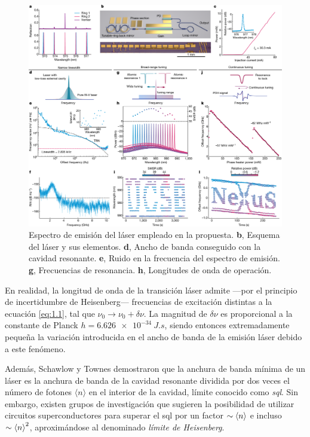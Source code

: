 \begin{figure}[ht!]
  \centering
  \includegraphics[width=\textwidth]{Figuras/ch1_amplif.png}
  \caption{Espectro de emisión del láser empleado en la propuesta\autocite{Tran2022}. \textbf{b}, Esquema del láser y sus elementos. \textbf{d}, Ancho de banda conseguido con la cavidad resonante. \textbf{e}, Ruido en la frecuencia del espectro de emisión. \textbf{g}, Frecuencias de resonancia. \textbf{h}, Longitudes de onda de operación.}
  \label{fig:ch1_amplif}
\end{figure}

En realidad, la longitud de onda de la transición láser admite ---por el principio de incertidumbre de Heisenberg--- frecuencias de excitación distintas a la ecuación \eqref{eq:1.1}, tal que $\nu_0\rightarrow\nu_0 + \delta\nu$. La magnitud de $\delta\nu$ es proporcional a la constante de Planck $h = \qty{6,626e-34}{J.s}$, siendo entonces extremadamente pequeña la variación introducida en el ancho de banda de la emisión láser debido a este fenómeno. 

Además, Schawlow y Townes demostraron que la anchura de banda mínima de un láser es la anchura de banda de la cavidad resonante dividida por dos veces el número de fotones $\langle n\rangle$ en el interior de la cavidad, límite conocido como \emph{\acrfull{sql}}. Sin embargo, existen grupos de investigación\autocite{Liu2021} que sugieren la posibilidad de utilizar circuitos superconductores para superar el \acrshort{sql} por un factor $\sim \left\langle n\right\rangle$ e incluso $\sim \left\langle n\right\rangle^{2}$, aproximándose al denominado \emph{límite de Heisenberg}.

